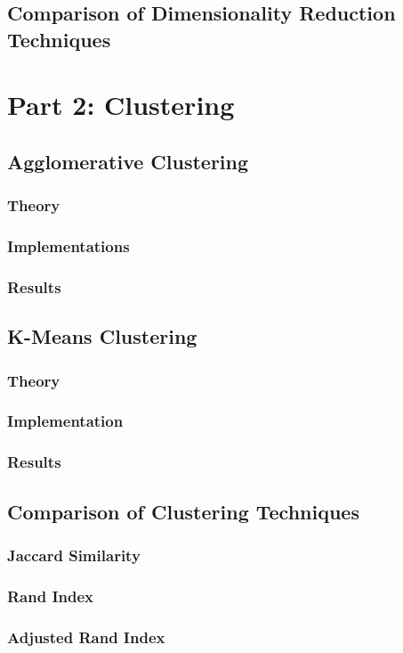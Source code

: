 \documentclass[12pt]{article}
\begin{document}
\subsection{Comparison of Dimensionality Reduction Techniques}

\section{Part 2: Clustering}
\subsection{Agglomerative Clustering}
\subsubsection{Theory}

\subsubsection{Implementations}

\subsubsection{Results}

\subsection{K-Means Clustering}
\subsubsection{Theory}

\subsubsection{Implementation}

\subsubsection{Results}

\subsection{Comparison of Clustering Techniques}
\subsubsection{Jaccard Similarity}

\subsubsection{Rand Index}

\subsubsection{Adjusted Rand Index}

\newpage
\printbibliography
\end{document}
